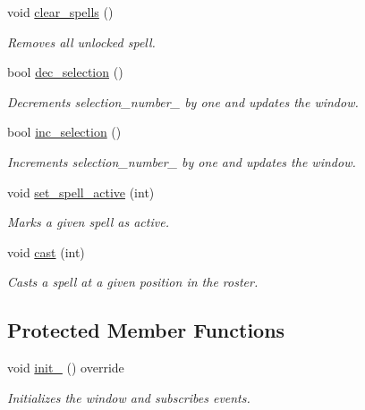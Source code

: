 \begin{DoxyCompactItemize}
void \hyperlink{class_spell_casting_window_a7e7bd79dbe26ff5d34d6cb6715cdd3da}{clear\+\_\+spells} ()
\begin{DoxyCompactList}\small\item\em Removes all unlocked spell. \end{DoxyCompactList}\item 
bool \hyperlink{class_spell_casting_window_a53b66d15a7bfc705e895f004bd20d190}{dec\+\_\+selection} ()
\begin{DoxyCompactList}\small\item\em Decrements selection\+\_\+number\+\_\+ by one and updates the window. \end{DoxyCompactList}\item 
bool \hyperlink{class_spell_casting_window_a0f36135dc7e1dce4e404bbbe3b4097e1}{inc\+\_\+selection} ()
\begin{DoxyCompactList}\small\item\em Increments selection\+\_\+number\+\_\+ by one and updates the window. \end{DoxyCompactList}\item 
void \hyperlink{class_spell_casting_window_add2b56aea794690948c162f4ad060fc7}{set\+\_\+spell\+\_\+active} (int)
\begin{DoxyCompactList}\small\item\em Marks a given spell as active. \end{DoxyCompactList}\item 
void \hyperlink{class_spell_casting_window_ae4bb2064f95fbcac079f53e22e2de709}{cast} (int)
\begin{DoxyCompactList}\small\item\em Casts a spell at a given position in the roster. \end{DoxyCompactList}\end{DoxyCompactItemize}
\subsection*{Protected Member Functions}
\begin{DoxyCompactItemize}
\item 
void \hyperlink{class_spell_casting_window_a49a11d637aeef3e71036c3af9e459088}{init\+\_\+} () override
\begin{DoxyCompactList}\small\item\em Initializes the window and subscribes events. \end{DoxyCompactList}\end{DoxyCompactItemize}
